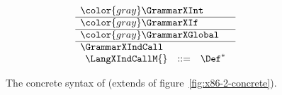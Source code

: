 \documentclass[7x10]{TimesAPriori_MIT}%
\newcommand{\gray}[1]{{\color{gray} #1}}
\numberwithin{theorem}{chapter}
\numberwithin{definition}{chapter}
\numberwithin{equation}{chapter}
\begin{document}
\newcommand{\ASTXIndCallRacket}{
\begin{array}{lcl}
  \Instr &::=& \INDCALLQ{\Arg}{\itm{int}}
    \MID \TAILJMP{\Arg}{\itm{int}}\\
    &\MID& \BININSTR{\code{'leaq}}{\Arg}{\REG{\Reg}}\\
  \Block &::= & \BLOCK{\itm{info}}{\LP\Instr\ldots\RP}\\
  \Def &::= & \DEF{\itm{label}}{\code{'()}}{\Type}{\itm{info}}{\LP\LP\itm{label}\,\key{.}\,\Block\RP\ldots\RP} 
\end{array}
}

\begin{figure}[tp]
  \begin{tcolorbox}[colback=white]
\small
\[
\begin{array}{l}
  \gray{\GrammarXInt} \\ \hline
  \gray{\GrammarXIf} \\ \hline
  \gray{\GrammarXGlobal} \\ \hline
  \GrammarXIndCall \\
\begin{array}{lcl}
\LangXIndCallM{} &::= & \Def^{*}
\end{array}
\end{array}
\]
  \end{tcolorbox}

\caption{The concrete syntax of \LangXIndCall{} (extends \LangXGlobal{} of figure~\ref{fig:x86-2-concrete}).}
\label{fig:x86-3-concrete}
\end{figure}
\end{document}
